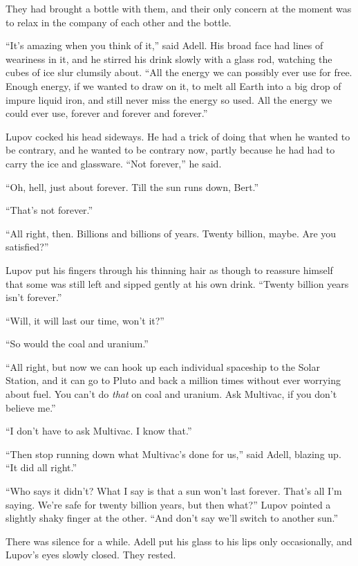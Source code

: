 They had brought a bottle with them, and their only concern at the moment was to relax in the company of each other and the bottle.

\enquote{It's amazing when you think of it,} said Adell. His broad face had lines of weariness in it, and he stirred his drink slowly with a glass rod, watching the cubes of ice slur clumsily about. \enquote{All the energy we can possibly ever use for free. Enough energy, if we wanted to draw on it, to melt all Earth into a big drop of impure liquid iron, and still never miss the energy so used. All the energy we could ever use, forever and forever and forever.}

Lupov cocked his head sideways. He had a trick of doing that when he wanted to be contrary, and he wanted to be contrary now, partly because he had had to carry the ice and glassware. \enquote{Not forever,} he said.

\enquote{Oh, hell, just about forever. Till the sun runs down, Bert.}

\enquote{That's not forever.}

\enquote{All right, then. Billions and billions of years. Twenty billion, maybe. Are you satisfied?}

Lupov put his fingers through his thinning hair as though to reassure himself that some was still left and sipped gently at his own drink. \enquote{Twenty billion years isn't forever.}

\enquote{Will, it will last our time, won't it?}

\enquote{So would the coal and uranium.}

\enquote{All right, but now we can hook up each individual spaceship to the Solar Station, and it can go to Pluto and back a million times without ever worrying about fuel. You can't do \textit{that} on coal and uranium. Ask Multivac, if you don't believe me.}

\enquote{I don't have to ask Multivac. I know that.}

\enquote{Then stop running down what Multivac's done for us,} said Adell, blazing up. \enquote{It did all right.}

\enquote{Who says it didn't? What I say is that a sun won't last forever. That's all I'm saying. We're safe for twenty billion years, but then what?} Lupov pointed a slightly shaky finger at the other. \enquote{And don't say we'll switch to another sun.}

There was silence for a while. Adell put his glass to his lips only occasionally, and Lupov's eyes slowly closed. They rested.

